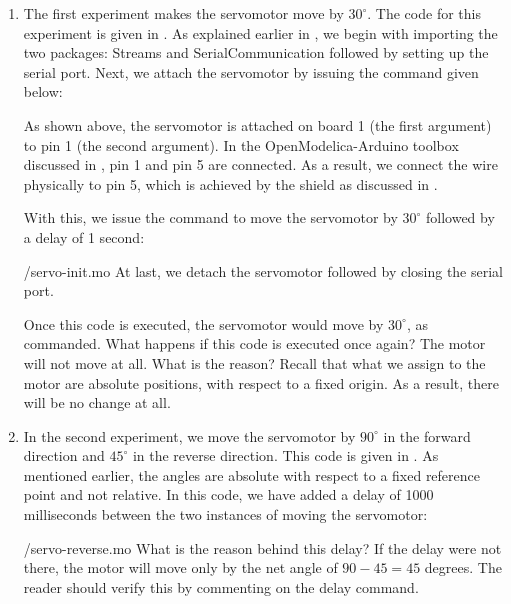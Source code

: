 \begin{enumerate}

  \item The first experiment makes the servomotor move by $30^\circ$. The code for this experiment is
        given in . As explained earlier in , 
        we begin with importing the two packages: Streams and SerialCommunication followed 
        by setting up the serial port. Next, we attach the servomotor by issuing the command given below:
        
        
        As shown above, the servomotor is attached on board 1 (the first argument)
        to pin 1 (the second argument).  In the OpenModelica-Arduino toolbox discussed 
        in , pin 1 and pin 5 are connected. As a result, we connect the wire physically to
        pin 5, which is achieved by the shield as discussed in .
        
        With this, we issue the command to move the servomotor by $30^\circ$ followed by a delay of 
        1 second:
        
        {\LocSEROpenModelicacode/servo-init.mo}
        At last, we  detach the servomotor followed by closing the serial port. 
        
        Once this code is executed, the servomotor would move by
        $30^\circ$, as commanded.  What happens if this code is executed
        once again?  The motor will not move at all.  What is the reason?
        Recall that what we assign to the motor are absolute positions, with
        respect to a fixed origin.  As a result, there will be no change at
        all. 
        
  \item In the second experiment, we move the servomotor by $90^\circ$ in the
        forward direction and $45^\circ$ in the reverse direction.  This
        code is given in .  As mentioned
        earlier, the angles are absolute with respect to a fixed reference
        point and not relative.   In this code, 
        we have added a delay of 1000 milliseconds between the two instances of 
        moving the servomotor: 
        
        {\LocSEROpenModelicacode/servo-reverse.mo}
        What is the reason behind this delay?  If the delay were not
        there, the motor will move only by the net angle of $90-45 = 45$
        degrees.  The reader should verify this by commenting on the delay
        command. 
        

\end{enumerate}
